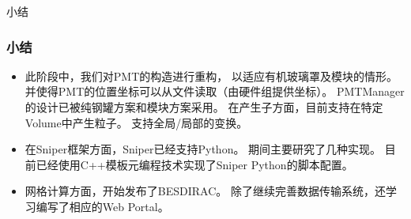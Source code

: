 \begin{frame}
    \begin{center}
        \LARGE 小结
    \end{center}
\end{frame}

\begin{frame}
    \frametitle{小结}
    \begin{itemize}
        \item 此阶段中，我们对PMT的构造进行重构，
              以适应有机玻璃罩及模块的情形。
              并使得PMT的位置坐标可以从文件读取（由硬件组提供坐标）。
              PMTManager的设计已被纯钢罐方案和模块方案采用。
              在产生子方面，目前支持在特定Volume中产生粒子。
              支持全局/局部的变换。
        \item 在Sniper框架方面，Sniper已经支持Python。
              期间主要研究了几种实现。
              目前已经使用C++模板元编程技术实现了Sniper Python的脚本配置。
        \item 网格计算方面，开始发布了BESDIRAC。
              除了继续完善数据传输系统，还学习编写了相应的Web Portal。
    \end{itemize}
\end{frame}

